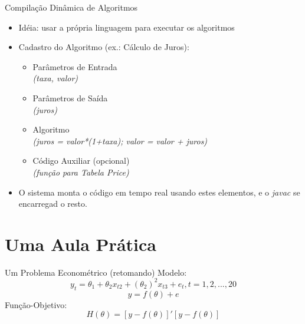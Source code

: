 \documentclass{beamer}
\begin{document}
\begin{frame}{Compilação Dinâmica de Algoritmos}
	\begin{itemize}
		\item Idéia: usar a própria linguagem para executar os algoritmos
		\item Cadastro do Algoritmo (ex.: Cálculo de Juros):
		\begin{itemize}
			\item Parâmetros de Entrada\\\textit{(taxa, valor)}
			\item Parâmetros de Saída \\\textit{(juros)}
			\item Algoritmo \\\textit{(juros = valor*(1+taxa); valor = valor + juros)}
			\item Código Auxiliar (opcional)\\ \textit{(função para Tabela Price)}
		\end{itemize}
		\item O sistema monta o código em tempo real usando estes elementos, e o \textit{javac} se encarregad o resto.
	\end{itemize}
\end{frame}

\begin{frame}
\begin{center}
\end{center}
\end{frame}

\section{Uma Aula Prática}

\begin{frame}{Um Problema Econométrico (retomando)}
Modelo:
\[ y_t = \theta_1 + \theta_2 x_{t2} + (\theta_2)^2 x_{t3} +e_t , t = 1,2,...,20 \]
\[ y = f(\theta)+e\]
Função-Objetivo: \[H(\theta) = [y - f(\theta)]'[y - f(\theta)] \]
\end{frame}
\end{document}
